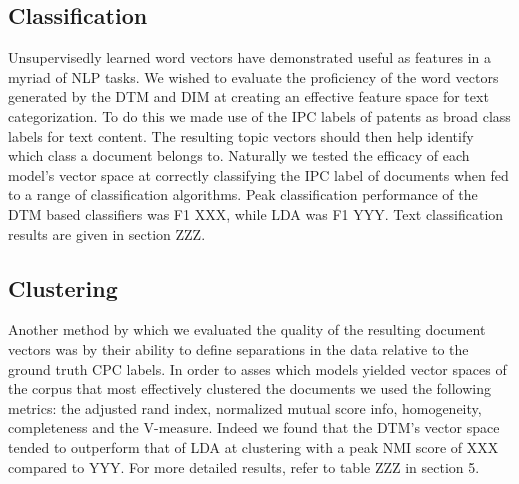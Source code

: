 \subsection{Classification}
Unsupervisedly learned word vectors have demonstrated useful as features in a myriad of NLP tasks. We wished to evaluate the proficiency of the word vectors generated by the DTM and DIM at creating an effective feature space for text categorization. To do this we made use of the IPC labels of patents as broad class labels for text content. The resulting topic vectors should then help identify which class a document belongs to. Naturally we tested the efficacy of each model's vector space at correctly classifying the IPC label of documents when fed to a range of classification algorithms. Peak classification performance of the DTM based classifiers was F1 XXX, while LDA was F1 YYY. Text classification results are given in section ZZZ.




\subsection{Clustering}
Another method by which we evaluated the quality of the resulting document vectors was by their ability to define separations in the data relative to the ground truth CPC labels. In order to asses which models yielded vector spaces of the corpus that most effectively clustered the documents we used the following metrics: the adjusted rand index, normalized mutual score info, homogeneity, completeness and the V-measure. Indeed we found that the DTM's vector space tended to outperform that of LDA at clustering with a peak NMI score of XXX compared to YYY. For more detailed results, refer to table ZZZ in section 5. 


 






